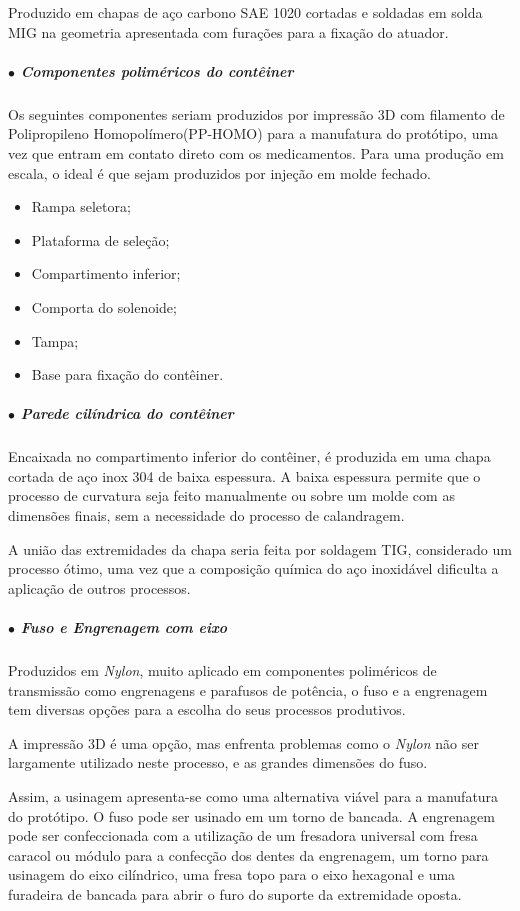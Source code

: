 Produzido em chapas de aço carbono SAE 1020 cortadas e soldadas em solda MIG na geometria apresentada com furações para a fixação do atuador.

\subparagraph*{$\bullet$ Componentes poliméricos do contêiner} \hfill

Os seguintes componentes seriam produzidos por impressão 3D com filamento de Polipropileno Homopolímero(PP-HOMO) para a manufatura do protótipo, uma vez que entram em contato direto com os medicamentos. Para uma produção em escala, o ideal é que sejam produzidos por injeção em molde fechado.

\begin{itemize}
    \item Rampa seletora;
    \item Plataforma de seleção;
    \item Compartimento inferior;
    \item Comporta do solenoide;
    \item Tampa;
    \item Base para fixação do contêiner.
\end{itemize}

\subparagraph*{$\bullet$ Parede cilíndrica do contêiner} \hfill 

Encaixada no compartimento inferior do contêiner, é produzida em uma chapa cortada de aço inox 304 de baixa espessura. A baixa espessura permite que o processo de curvatura seja feito manualmente ou sobre um molde com as dimensões finais, sem a necessidade do processo de calandragem.

A união das extremidades da chapa seria feita por soldagem TIG, considerado um processo ótimo, uma vez que a composição química do aço inoxidável dificulta a aplicação de outros processos.

\subparagraph*{$\bullet$ Fuso e Engrenagem com eixo} \hfill

Produzidos em \textit{Nylon}, muito aplicado em componentes poliméricos de transmissão como engrenagens e parafusos de potência, o fuso e a engrenagem tem diversas opções para a escolha do seus processos produtivos.

A impressão 3D é uma opção, mas enfrenta problemas como o \textit{Nylon} não ser largamente utilizado neste processo, e as grandes dimensões do fuso.

Assim, a usinagem apresenta-se como uma alternativa viável para a manufatura do protótipo. O fuso pode ser usinado em um torno de bancada. A engrenagem pode ser confeccionada com a utilização de um fresadora universal com fresa caracol ou módulo para a confecção dos dentes da engrenagem, um torno para usinagem do eixo cilíndrico, uma fresa topo para o eixo hexagonal e uma furadeira de bancada para abrir o furo do suporte da extremidade oposta.

